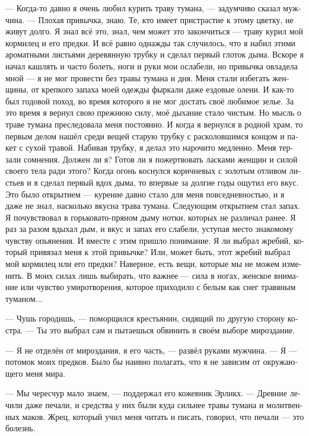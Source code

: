 \documentclass[a4paper,12pt,fleqn]{book}\usepackage{cooltooltips}\usepackage{polyglossia}\setdefaultlanguage[babelshorthands=true]{russian}\setotherlanguage{english}\defaultfontfeatures{Ligatures=TeX,Mapping=tex-text} \usepackage{xcolor}\definecolor{lightgray}{HTML}{bbbbbb}\color{lightgray}\newcommand{\ml}[3]{\textenglish{\textcolor{black}{#3}}}
\begin{document}
{--- Когда-то давно я очень любил курить траву тумана, --- задумчиво сказал мужчина.
--- Плохая привычка, знаю.
Те, кто имеет пристрастие к этому цветку, не живут долго.
Я знал всё это, знал, чем может это закончиться --- траву курил мой кормилец и его предки.
И всё равно однажды так случилось, что я набил этими ароматными листьями деревянную трубку и сделал первый глоток дыма.
Вскоре я начал кашлять и часто болеть, ноги и руки мои ослабели, но привычка овладела мной --- я не мог провести без травы тумана и дня.
Меня стали избегать женщины, от крепкого запаха моей одежды фыркали даже ездовые олени.
И как-то был годовой поход, во время которого я не мог достать своё любимое зелье.
За это время я вернул свою прежнюю силу, моё дыхание стало чистым.
Но мысль о траве тумана преследовала меня постоянно.
И когда я вернулся в родной храм, то первым делом нашёл среди вещей старую трубку с расколовшимся концом и пакет с сухой травой.
Набивая трубку, я делал это нарочито медленно.
Меня терзали сомнения.
Должен ли я?
Готов ли я пожертвовать ласками женщин и силой своего тела ради этого?
Когда огонь коснулся коричневых с золотым отливом листьев и я сделал первый вдох дыма, то впервые за долгие годы ощутил его вкус.
Это было открытием --- курение давно стало для меня повседневностью, и я даже не знал, насколько вкусна трава тумана.
Следующим открытием стал запах.
Я почувствовал в горьковато-пряном дыму нотки, которых не различал ранее.
Я раз за разом вдыхал дым, и вкус и запах его слабели, уступая место знакомому чувству опьянения.
И вместе с этим пришло понимание.
Я ли выбрал жребий, который привязал меня к этой привычке?
Или, может быть, этот жребий выбрал мой кормилец или его предки?
Наверное, есть вещи, которые мы не можем изменить.
В моих силах лишь выбирать, что важнее --- сила в ногах, женское внимание или чувство умиротворения, которое приходило с белым как снег травяным туманом...

--- Чушь городишь, --- поморщился крестьянин, сидящий по другую сторону костра.
--- Ты это выбрал сам и пытаешься обвинить в своём выборе мироздание.

--- Я не отделён от мироздания, я его часть, --- развёл руками мужчина.
--- Я --- потомок моих предков.
Было бы наивно полагать, что я не зависим от окружающего меня мира.

--- Мы чересчур мало знаем, --- поддержал его кожевник Эрликх.
--- Древние лечили даже печали, и средства у них были куда сильнее травы тумана и молитвенных маков.
Жрец, который учил меня читать и писать, говорил, что печали --- это болезнь.

}
\end{document}

